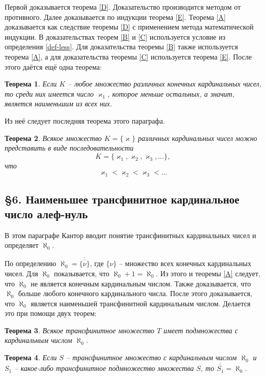 \documentclass[a4paper,12pt]{extarticle}
\newtheorem{theorem}{Теорема}[subsection]
\theoremstyle{definition}
\newcommand{\car}[1]{\overline{\overline{#1}}}
\begin{document}
Первой доказывается теорема \ref{D}.
Доказательство производится методом от противного.
Далее доказывается по индукции теорема \ref{E}.
Теорема \ref{A} доказывается как следствие теоремы \ref{D} с применением метода математической индукции.
В доказательствах теорем \ref{B} и \ref{C} используется условие из определения \ref{def-less}.
Для доказательства теоремы \ref{B} также используется теорема \ref{A}, а для доказательства теоремы \ref{C} используется теорема \ref{E}.
После этого даётся ещё одна теорема:
\begin{theorem}
\label{F}
Если $K$ -- любое множество различных конечных кардинальных чисел, то среди них имеется число $\varkappa_1$, которое меньше остальных, а значит, является наименьшим из всех них.
\end{theorem}
Из неё следует последняя теорема этого параграфа.
\begin{theorem}
\label{G}
    Всякое множество $K = \{\varkappa\}$ различных кардинальных чисел можно представить в виде последовательности 
    $$K = \{\varkappa_1, \varkappa_2, \varkappa_3, ...\},$$ что $$\varkappa_1 < \varkappa_2 < \varkappa_3 < ...$$
\end{theorem}

\subsection{\S 6. Наименьшее трансфинитное кардинальное число алеф-нуль}
В этом параграфе Кантор вводит понятие трансфинитных кардинальных чисел и определяет $\aleph_0$.

По определению $\aleph_0 = \car{\{\nu\}}$, где $\{\nu\}$ -- множество всех конечных кардинальных чисел.
Для $\aleph_0$ показывается, что $\aleph_0 + 1 = \aleph_0$.
Из этого и теоремы \ref{A} следует, что $\aleph_0$ не является конечным кардинальным числом.
Также доказывается, что $\aleph_0$ больше любого конечного кардинального числа.
После этого доказывается, что $\aleph_0$ является наименьшей трансфинитной кардинальным числом.
Делается это при помощи двух теорем:
\begin{theorem}
    Всякое трансфинитное множество $T$ имеет подмножества с кардинальным числом $\aleph_0$.
\end{theorem}
\begin{theorem}
    Если $S$ -- трансфинитное множество с кардинальным числом $\aleph_0$ и $S_1$ -- какое-либо трансфинитное подмножество множества $S$, то $\car{S_1} = \aleph_0$.
\end{theorem}
\end{document}
